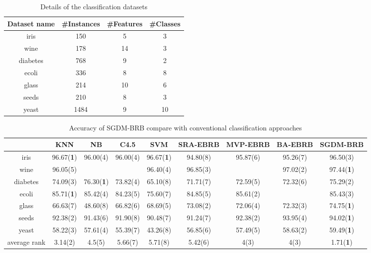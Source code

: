 \documentclass{ieeeaccess}
\begin{document}
\begin{table}
    \caption{Details of the classification datasets}
    \centering
    \label{tab4}
    \begin{tabular}{cccc}
        \hline
        Dataset name & \#Instances & \#Features & \#Classes \\
        \hline
        iris         & 150         & 5          & 3         \\
        wine         & 178         & 14         & 3         \\
        diabetes     & 768         & 9          & 2         \\
        ecoli        & 336         & 8          & 8         \\
        glass        & 214         & 10         & 6         \\
        seeds        & 210         & 8          & 3         \\
        yeast        & 1484        & 9          & 10        \\
        \hline
    \end{tabular}
\end{table}

\begin{table}
    \caption{Accuracy of SGDM-BRB compare with conventional classification approaches}
    \centering
    \label{tab5}
    \begin{tabular}{|c|c|c|c|c|c|c|c|c|}
        \hline
                     & KNN               & NB                & C4.5     & SVM               & SRA-EBRB & MVP-EBRB & BA-EBRB  & SGDM-BRB          \\
        \hline
        iris         & 96.67(\textbf{1}) & 96.00(4)          & 96.00(4) & 96.67(\textbf{1}) & 94.80(8) & 95.87(6) & 95.26(7) & 96.50(3)          \\
        wine         & 96.05(5)          &                   &          & 96.40(4)          & 96.85(3) &          & 97.02(2) & 97.44(\textbf{1}) \\
        diabetes     & 74.09(3)          & 76.30(\textbf{1}) & 73.82(4) & 65.10(8)          & 71.71(7) & 72.59(5) & 72.32(6) & 75.29(2)          \\
        ecoli        & 85.71(\textbf{1}) & 85.42(4)          & 84.23(5) & 75.60(7)          & 84.85(5) & 85.61(2) &          & 85.43(3)          \\
        glass        & 66.63(7)          & 48.60(8)          & 66.82(6) & 68.69(5)          & 73.08(2) & 72.06(4) & 72.32(3) & 74.75(\textbf{1}) \\
        seeds        & 92.38(2)          & 91.43(6)          & 91.90(8) & 90.48(7)          & 91.24(7) & 92.38(2) & 93.95(4) & 94.02(\textbf{1}) \\
        yeast        & 58.22(3)          & 57.61(4)          & 55.39(7) & 43.26(8)          & 56.85(6) & 57.49(5) & 58.63(2) & 59.49(\textbf{1}) \\
        \hline
        average rank & 3.14(2)           & 4.5(5)            & 5.66(7)  & 5.71(8)           & 5.42(6)  & 4(3)     & 4(3)     & 1.71(\textbf{1})  \\
        \hline
    \end{tabular}
\end{table}
\end{document}
